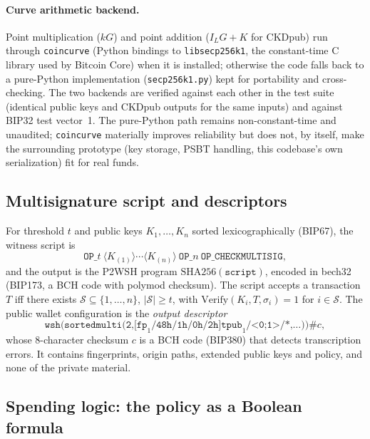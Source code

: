 \documentclass[11pt,a4paper]{article}
\theoremstyle{plain}
\theoremstyle{definition}
\begin{document}
\paragraph{Curve arithmetic backend.} Point multiplication ($kG$) and point addition
($I_LG+K$ for CKDpub) run through \texttt{coincurve} (Python bindings to
\texttt{libsecp256k1}, the constant-time C library used by Bitcoin Core) when it is
installed; otherwise the code falls back to a pure-Python implementation
(\texttt{secp256k1.py}) kept for portability and cross-checking. The two backends are
verified against each other in the test suite (identical public keys and CKDpub outputs
for the same inputs) and against BIP32 test vector~1. The pure-Python path remains
non-constant-time and unaudited; \texttt{coincurve} materially improves reliability but
does not, by itself, make the surrounding prototype (key storage, PSBT handling, this
codebase's own serialization) fit for real funds.

\subsection{Multisignature script and descriptors}

For threshold $t$ and public keys $K_1,\dots,K_n$ sorted lexicographically
(BIP67), the witness script is
\begin{equation}
    \texttt{OP\_}t\ \langle K_{(1)}\rangle\cdots\langle K_{(n)}\rangle\ \texttt{OP\_}n\ \texttt{OP\_CHECKMULTISIG},
\end{equation}
and the output is the P2WSH program $\mathrm{SHA256}(\texttt{script})$,
encoded in bech32 (BIP173, a BCH code with polymod checksum). The script
accepts a transaction $T$ iff there exists $\mathcal{S}\subseteq\{1,\dots,n\}$,
$|\mathcal{S}|\ge t$, with $\mathrm{Verify}(K_i,T,\sigma_i)=1$ for $i\in\mathcal{S}$.
The public wallet configuration is the \emph{output descriptor}
\[
\texttt{wsh(sortedmulti(2,[fp}_1\texttt{/48h/1h/0h/2h]tpub}_1\texttt{/<0;1>/*,\ldots))\#}c,
\]
whose $8$-character checksum $c$ is a BCH code (BIP380) that detects transcription errors.
It contains fingerprints, origin paths, extended public keys and policy, and
none of the private material.

\subsection{Spending logic: the policy as a Boolean formula}\label{sec:spending}
\end{document}
